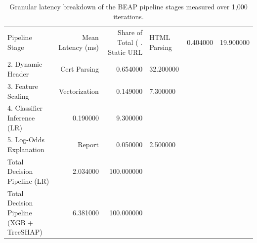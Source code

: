 \begin{table}
\caption{Granular latency breakdown of the BEAP pipeline stages measured over 1,000 iterations.}
\label{tab:latency_breakdown}
\begin{tabular}{lrr}
\toprule
Pipeline Stage & Mean Latency (ms) & Share of Total (%
. Static URL & HTML Parsing & 0.404000 & 19.900000 \\
2. Dynamic Header & Cert Parsing & 0.654000 & 32.200000 \\
3. Feature Scaling & Vectorization & 0.149000 & 7.300000 \\
4. Classifier Inference (LR) & 0.190000 & 9.300000 \\
5. Log-Odds Explanation & Report & 0.050000 & 2.500000 \\
Total Decision Pipeline (LR) & 2.034000 & 100.000000 \\
Total Decision Pipeline (XGB + TreeSHAP) & 6.381000 & 100.000000 \\
\bottomrule
\end{tabular}
\end{table}
